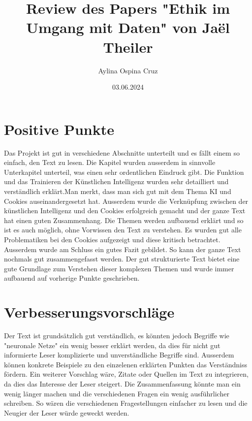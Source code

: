 \documentclass{article}
\title{Review des Papers "Ethik im Umgang mit Daten" von Jaël Theiler}
\author{Aylina Ospina Cruz}
\date{03.06.2024}
\begin{document}
\maketitle

\section{Positive Punkte}
Das Projekt ist gut in verschiedene Abschnitte unterteilt und es fällt einem so einfach, den Text zu lesen. Die Kapitel wurden ausserdem in sinnvolle Unterkapitel unterteil, was einen sehr ordentlichen Eindruck gibt. Die Funktion und das Trainieren der Künstlichen Intelligenz wurden sehr detailliert und verständlich erklärt.Man merkt, dass man sich gut mit dem Thema KI und Cookies auseinandergesetzt hat. Ausserdem wurde die Verknüpfung zwischen der künstlichen Intelligenz und den Cookies erfolgreich gemacht und der ganze Text hat einen guten Zusammenhang. Die Themen werden aufbauend erklärt und so ist es auch möglich, ohne Vorwissen den Text zu verstehen. Es wurden gut alle Problematiken bei den Cookies aufgezeigt und diese kritisch betrachtet. Ausserdem wurde am Schluss ein gutes Fazit gebildet. So kann der ganze Text nochmals gut zusammengefasst werden. Der gut strukturierte Text bietet eine gute Grundlage zum Verstehen dieser komplexen Themen und wurde immer aufbauend auf vorherige Punkte geschrieben. 

\section{Verbesserungsvorschläge}

Der Text ist grundsätzlich gut verständlich, es könnten jedoch Begriffe wie "neuronale Netze" ein wenig besser erklärt werden, da dies für nicht gut informierte Leser komplizierte und unverständliche Begriffe sind. Ausserdem können konkrete Beispiele zu den einzelenen erklärten Punkten das Verständniss fördern. Ein weiterer Vorschlag wäre, Zitate oder Quellen im Text zu integrieren, da dies das Interesse der Leser steigert. Die Zusammenfassung könnte man ein wenig länger machen und die verschiedenen Fragen ein wenig ausführlicher schreiben. So wären die verschiedenen Fragestellungen einfacher zu lesen und die Neugier der Leser würde geweckt werden.
\printbibliography
\end{document}
